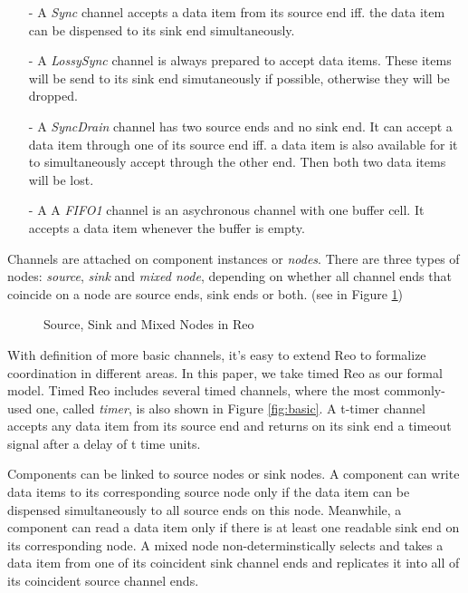 \documentclass[conference, a4paper]{IEEEtran}
\begin{document}
\begin{itemize}
  \item [-] A \emph{Sync} channel accepts a data item from its source end iff. the data item can be
    dispensed to its sink end simultaneously.
  \item [-] A \emph{LossySync} channel is always prepared to accept data items. These items will be
    send to its sink end simutaneously if possible, otherwise they will be dropped.
  \item [-] A \emph{SyncDrain} channel has two source ends and no sink end. It can accept a data
    item through one of its source end iff. a data item is also available for it to simultaneously
    accept through the other end. Then both two data items will be lost.
  \item [-] A A \emph{FIFO1} channel is an asychronous channel with one buffer cell. It accepts a
    data item whenever the buffer is empty.  
\end{itemize}

Channels are attached on component instances or \emph{nodes}. There are three types of nodes:
\emph{source}, \emph{sink} and \emph{mixed node}, depending on whether all channel ends that
coincide on a node are source ends, sink ends or both. (see in Figure \ref{fig:node})

\begin{figure}[h]
  \begin{center}
    
  \end{center}
  \caption{Source, Sink and Mixed Nodes in Reo}
  \label{fig:node}
\end{figure}



With definition of more basic channels, it's easy to extend Reo to formalize coordination in
different areas. In this paper, we take timed Reo\cite{DBLP:conf/sefm/ArbabBBR04} as our formal
model. Timed Reo includes several timed channels, where the most commonly-used one, called
\emph{timer}, is also shown in Figure \ref{fig:basic}. A t-timer channel accepts any data item from
its source end and returns on its sink end a timeout signal after a delay of t time units.

Components can be linked to source nodes or sink nodes. A component can write data items to its
corresponding source node only if the data item can be dispensed simultaneously to all source ends
on this node. Meanwhile, a component can read a data item only if there is at least one readable
sink end on its corresponding node. A mixed node non-determinstically selects and takes a data item
from one of its coincident sink channel ends and replicates it into all of its coincident source
channel ends.
\end{document}
